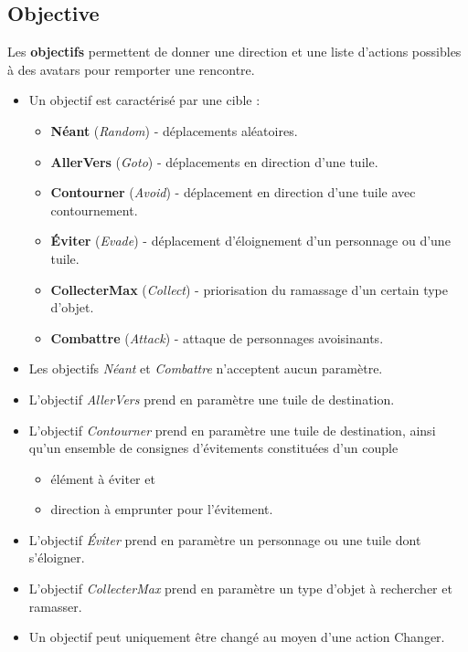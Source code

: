 \subsection{Objective}
Les \textbf{objectifs} permettent de donner une direction et une liste d'actions possibles à des avatars pour remporter une rencontre.
    \begin{itemize}
        \item Un objectif est caractérisé par une cible :
            \begin{itemize}
                \item \textbf{Néant} (\textit{Random}) - déplacements aléatoires.
                \item \textbf{AllerVers} (\textit{Goto}) - déplacements en direction d'une tuile.
                \item \textbf{Contourner} (\textit{Avoid}) - déplacement en direction d'une tuile avec contournement.
                \item \textbf{Éviter} (\textit{Evade}) - déplacement d'éloignement d'un personnage ou d'une tuile.
                \item \textbf{CollecterMax} (\textit{Collect}) - priorisation du ramassage d'un certain type d'objet.
                \item \textbf{Combattre} (\textit{Attack}) - attaque de personnages avoisinants.
            \end{itemize}
        \item Les objectifs \textit{Néant} et \textit{Combattre} n'acceptent aucun paramètre.
        \item L'objectif \textit{AllerVers} prend en paramètre une tuile de destination.
        \item L'objectif \textit{Contourner} prend en paramètre une tuile de destination, ainsi qu'un ensemble de consignes d'évitements constituées d'un couple 
            \begin{itemize}
                \item élément à éviter et 
                \item direction à emprunter pour l'évitement.
            \end{itemize}
        \item L'objectif \textit{Éviter} prend en paramètre un personnage ou une tuile dont s'éloigner.
        \item L'objectif \textit{CollecterMax} prend en paramètre un type d'objet à rechercher et ramasser.
        \item Un objectif peut uniquement être changé au moyen d'une action Changer.

\end{itemize}
